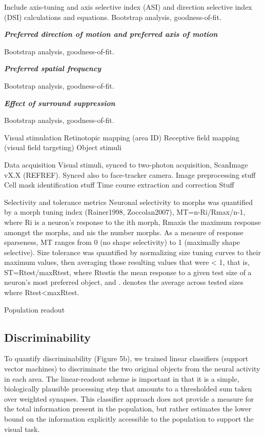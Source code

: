 Include axis-tuning and axis selective index (ASI) and direction selective index (DSI) calculations and equations. Bootstrap analysis, goodness-of-fit.

\textbf{\textit{Preferred direction of motion and preferred axis of motion}}

Bootstrap analysis, goodness-of-fit.

\textbf{\textit{Preferred spatial frequency}}

Bootstrap analysis, goodness-of-fit.

\textbf{\textit{Effect of surround suppression}}

Bootstrap analysis, goodness-of-fit.



Visual stimulation
Retinotopic mapping (area ID)
Receptive field mapping (visual field targeting)
Object stimuli

Data acquisition
Visual stimuli, synced to two-photon acquisition, ScanImage vX.X (REFREF). 
Synced also to face-tracker camera.
Image preprocessing
stuff
Cell mask identification
stuff
Time course extraction and correction
Stuff



Selectivity and tolerance metrics
Neuronal selectivity to morphs was quantified by a morph tuning index (Rainer1998, Zoccolan2007), MT=n-Ri/Rmax/n-1, where Ri is a neuron’s response to the ith morph, Rmaxis the maximum response amongst the morphs, and nis the number morphs. As a measure of response sparseness, MT ranges from 0 (no shape selectivity) to 1 (maximally shape selective). Size tolerance was quantified by normalizing size tuning curves to their maximum values, then averaging those resulting values that were < 1, that is, ST=Rtest/maxRtest, where Rtestis the mean response to a given test size of a neuron’s most preferred object, and . denotes the average across tested sizes where Rtest<maxRtest. 


Population readout

\subsection{Discriminability}
To quantify discriminability (Figure 5b), we trained linear classifiers (support vector machines) to discriminate the two original objects from the neural activity in each area. The linear-readout scheme is important in that it is a simple, biologically plausible processing step that amounts to a thresholded sum taken over weighted synapses\cite{}. This classifier approach does not provide a measure for the total information present in the population, but rather estimates the lower bound on the information explicitly accessible to the population to support the visual task\cite{everyone, Hung2005, Rust2010, etc etc}.

